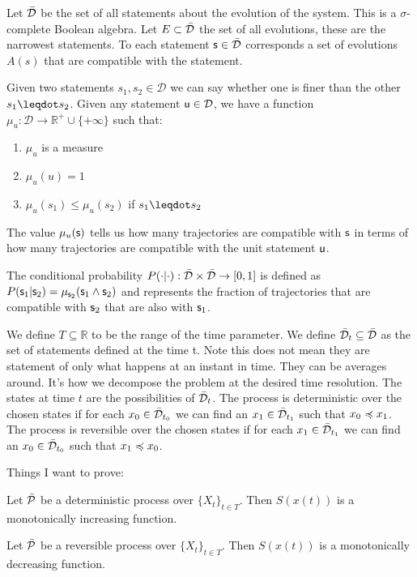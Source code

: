 \documentclass[letterpaper]{article}
\begin{document}
Let $\tdomain$ be the set of all statements about the evolution of the system. This is a $\sigma$-complete Boolean algebra. Let $E \subset \tdomain$ the set of all evolutions, these are the narrowest statements. To each statement $\stmt \in \tdomain$ corresponds a set of evolutions $A(s)$ that are compatible with the statement.

Given two statements $s_1, s_2 \in \mathcal{D}$ we can say whether one is finer than the other $s_1 \finer s_2$. Given any statement $\stmt[u] \in \mathcal{D}$, we have a function $\mu_u : \mathcal{D} \to \mathbb{R}^+\cup \{+\infty \}$ such that:
\begin{enumerate}
	\item $\mu_u$ is a measure
	\item $\mu_u(u) = 1$
	\item $\mu_u(s_1) \leq \mu_u(s_2)$ if $s_1 \finer s_2$
\end{enumerate}
The value $\mu_u(\stmt)$ tells us how many trajectories are compatible with $\stmt$ in terms of how many trajectories are compatible with the unit statement $\stmt[u]$.

The conditional probability $P(\cdot | \cdot) : \tdomain \times \tdomain \to [0,1]$ is defined as $P(\stmt_1 | \stmt_2) = \mu_{\stmt_2}(\stmt_1 \AND \stmt_2)$ and represents the fraction of trajectories that are compatible with $\stmt_2$ that are also with $\stmt_1$.

We define $T \subseteq \mathbb{R}$ to be the range of the time parameter. We define $\tdomain_{t} \subseteq \tdomain$ as the set of statements defined at the time t. Note this does not mean they are statement of only what happens at an instant in time. They can be averages around. It's how we decompose the problem at the desired time resolution. The states at time $t$ are the possibilities of $\tdomain_t$. The process is deterministic over the chosen states if for each $x_0 \in \tdomain_{t_0}$ we can find an $x_1 \in \tdomain_{t_1}$ such that $x_0 \narrower x_1$.  The process is reversible over the chosen states if for each $x_1 \in \tdomain_{t_1}$ we can find an $x_0 \in \tdomain_{t_0}$ such that $x_1 \narrower x_0$.

Things I want to prove:

\begin{prop}
	Let $\tdomain[P]$ be a deterministic process over $\{X_t\}_{t \in T}$. Then $S(x(t))$ is a monotonically increasing function.
\end{prop}

\begin{prop}
	Let $\tdomain[P]$ be a reversible process over $\{X_t\}_{t \in T}$. Then $S(x(t))$ is a monotonically decreasing function.
\end{prop}
\end{document}
